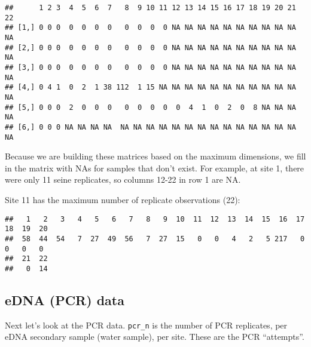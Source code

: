\documentclass[
]{article}
\newenvironment{Shaded}{\begin{snugshade}}{\end{snugshade}}
\newcommand{\DecValTok}[1]{\textcolor[rgb]{0.00,0.00,0.81}{#1}}
\newcommand{\FunctionTok}[1]{\textcolor[rgb]{0.13,0.29,0.53}{\textbf{#1}}}
\newcommand{\NormalTok}[1]{#1}
\newcommand{\SpecialCharTok}[1]{\textcolor[rgb]{0.81,0.36,0.00}{\textbf{#1}}}
\begin{document}
\begin{Shaded}
\end{Shaded}

\begin{verbatim}
##      1 2 3  4  5  6  7   8  9 10 11 12 13 14 15 16 17 18 19 20 21 22
## [1,] 0 0 0  0  0  0  0   0  0  0  0 NA NA NA NA NA NA NA NA NA NA NA
## [2,] 0 0 0  0  0  0  0   0  0  0  0 NA NA NA NA NA NA NA NA NA NA NA
## [3,] 0 0 0  0  0  0  0   0  0  0  0 NA NA NA NA NA NA NA NA NA NA NA
## [4,] 0 4 1  0  2  1 38 112  1 15 NA NA NA NA NA NA NA NA NA NA NA NA
## [5,] 0 0 0  2  0  0  0   0  0  0  0  0  4  1  0  2  0  8 NA NA NA NA
## [6,] 0 0 0 NA NA NA NA  NA NA NA NA NA NA NA NA NA NA NA NA NA NA NA
\end{verbatim}

Because we are building these matrices based on the maximum dimensions,
we fill in the matrix with NAs for samples that don't exist. For
example, at site 1, there were only 11 seine replicates, so columns
12-22 in row 1 are NA.

Site 11 has the maximum number of replicate observations (22):

\begin{Shaded}
\end{Shaded}

\begin{verbatim}
##   1   2   3   4   5   6   7   8   9  10  11  12  13  14  15  16  17  18  19  20 
##  58  44  54   7  27  49  56   7  27  15   0   0   4   2   5 217   0   0   0   0 
##  21  22 
##   0  14
\end{verbatim}

\subsection{eDNA (PCR) data}\label{edna-pcr-data}

Next let's look at the PCR data. \texttt{pcr\_n} is the number of PCR
replicates, per eDNA secondary sample (water sample), per site. These
are the PCR ``attempts''.

\begin{Shaded}
\end{Shaded}
\end{document}
